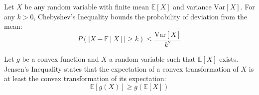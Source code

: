     \begin{tcolorbox}[colback=orange!10!white, colframe=green!10!black, title=Chebyshev's Inequality]
    \raggedright Let \( X \) be any random variable with finite mean \( \mathbb{E}[X] \) and variance \( \mathrm{Var}[X] \). For any \( k > 0 \), Chebyshev's Inequality bounds the probability of deviation from the mean:
    \[
    P(|X - \mathbb{E}[X]| \geq k) \leq \frac{\mathrm{Var}[X]}{k^2}
    \]
    \end{tcolorbox}
    
    \begin{tcolorbox}[colback=violet!10!white, colframe=violet!70!black, title=Jensen's Inequality]
    \raggedright Let \( g \) be a convex function and \( X \) a random variable such that \( \mathbb{E}[X] \) exists. Jensen's Inequality states that the expectation of a convex transformation of \( X \) is at least the convex transformation of its expectation:
    \[
    \mathbb{E}[g(X)] \geq g(\mathbb{E}[X])
    \]
    \end{tcolorbox}